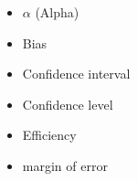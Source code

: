 \documentclass[11pt, chapterprefix=true]{scrbook}\usepackage[]{graphicx}\usepackage[]{color}
\begin{document}
\colorbox{lgray}{\parbox{14cm}{
\begin{minipage}[ht]{6cm}

\begin{itemize}
\item $\alpha$ (Alpha)
\item Bias
\item Confidence interval
\end{itemize}
\end{minipage} \hfill
\begin{minipage}[ht]{6cm}

\begin{itemize}
\item Confidence level
\item Efficiency
\item margin of error
\end{itemize}
\end{minipage}
}}


\twocolumn
\end{document}
